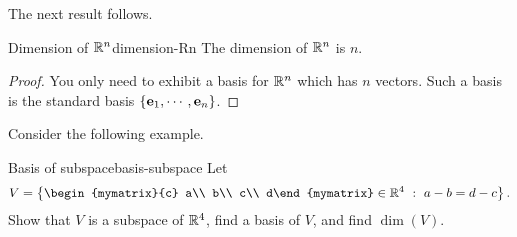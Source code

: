 The next result follows.

\begin{corollary}{Dimension of $\mathbb{R}^n$}{dimension-Rn}
The dimension of $\mathbb{R}^{n}$ is $n.$ 
\end{corollary}

\begin{proof}
You only need to exhibit a basis for $\mathbb{R}^{n}$ which
has $n$ vectors. Such a basis is the standard basis $\left\{\mbox{\bf e}_{1},\cdots , \mbox{\bf e}_{n}\right\} $.
\end{proof}

Consider the following example.

\begin{example}{Basis of subspace}{basis-subspace}
Let 
\[ V=\set{
\begin{mymatrix}{c} a\\ b\\ c\\ d\end{mymatrix}\in\R^4
~:~ a-b=d-c }.\]
Show that $V$ is a subspace of $\mathbb{R}^4$,
find a basis of $V$, and find $\dim(V)$.
\end{example}

